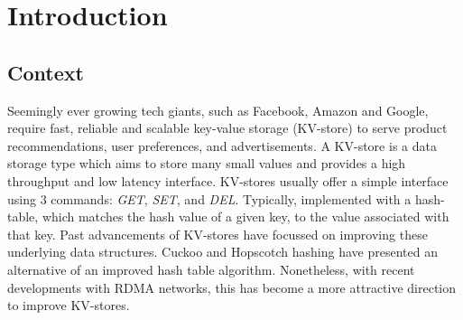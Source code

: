 

\chapter{Introduction}








\section{Context}
Seemingly ever growing tech giants, such as Facebook, Amazon and Google, require fast, reliable and scalable key-value storage (KV-store) to serve product recommendations, user preferences, and advertisements\cite{decandia2007dynamo,geambasu2010comet}.
A KV-store is a data storage type which aims to store many small values and provides a high throughput and low latency interface.
KV-stores usually offer a simple interface using 3 commands: \textit{GET}, \textit{SET}, and \textit{DEL}.
Typically, implemented with a hash-table, which matches the hash value of a given key, to the value associated with that key.
Past advancements of KV-stores have focussed on improving these underlying data structures\cite{escriva2012hyperdex, lim2014mica}.
Cuckoo and Hopscotch hashing\cite{kalia2014using, FaRM} have presented an alternative of an improved hash table algorithm.
Nonetheless, with recent developments with RDMA networks, this has become a more attractive direction to improve KV-stores\cite{chen2019scalable}.

